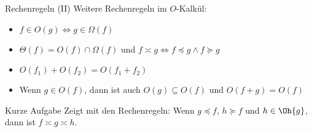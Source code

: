 \begin{frame}{Rechenregeln (II)}
	Weitere Rechenregeln im $O$-Kalkül:
	\begin{itemize}[<+->]
		\item $f \in O(g) \iff g \in \Omega(f)$
		\item $\Theta(f) = O(f) \cap \Omega(f)$ und $f \asymp g \iff f \preceq g \wedge f \succeq g$ 
		\item $O(f_1) + O(f_2) = O(f_1 + f_2)$
		\item Wenn $g \in O(f)$, dann ist auch $O(g) \subseteq O(f)$ und $O(f + g) = O(f)$
	\end{itemize}

	\begin{block}{Kurze Aufgabe}
		Zeigt mit den Rechenregeln: Wenn $g\preceq f$, $h \succeq f$ und $h\in\Oh{g}$, dann ist $f \asymp g \asymp h$.
	\end{block}
\end{frame}


%
%
